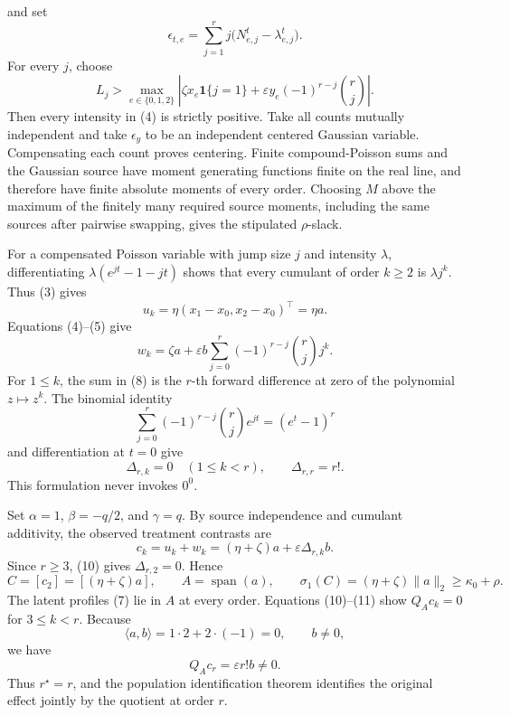 and set
\[
 \epsilon_{t,e}=\sum_{j=1}^r j\bigl(N^t_{e,j}-\lambda_{e,j}^t\bigr).      \tag{5}
\]
For every \(j\), choose
\[
 L_j>\max_{e\in\{0,1,2\}}
 \left|\zeta x_e\mathbf 1\{j=1\}
   +\varepsilon y_e(-1)^{r-j}\binom rj\right|.                           \tag{6}
\]
Then every intensity in (4) is strictly positive.  Take all counts mutually independent and take \(\epsilon_y\) to be an independent centered Gaussian variable.  Compensating each count proves centering.  Finite compound-Poisson sums and the Gaussian source have moment generating functions finite on the real line, and therefore have finite absolute moments of every order.  Choosing \(M\) above the maximum of the finitely many required source moments, including the same sources after pairwise swapping, gives the stipulated \(\rho\)-slack.

For a compensated Poisson variable with jump size \(j\) and intensity \(\lambda\), differentiating \(\lambda(e^{jt}-1-jt)\) shows that every cumulant of order \(k\geq2\) is \(\lambda j^k\).  Thus (3) gives
\[
 u_k=\eta(x_1-x_0,x_2-x_0)^\top=\eta a.                                  \tag{7}
\]
Equations (4)--(5) give
\[
 w_k=\zeta a+\varepsilon b
       \sum_{j=0}^r(-1)^{r-j}\binom rj j^k.                              \tag{8}
\]
For \(1\leq k\), the sum in (8) is the \(r\)-th forward difference at zero of the polynomial \(z\mapsto z^k\).  The binomial identity
\[
 \sum_{j=0}^r(-1)^{r-j}\binom rj e^{jt}=(e^t-1)^r                        \tag{9}
\]
and differentiation at \(t=0\) give
\[
 \Delta_{r,k}=0\quad(1\leq k<r),
 \qquad \Delta_{r,r}=r!.                                                  \tag{10}
\]
This formulation never invokes \(0^0\).

Set \(\alpha=1\), \(\beta=-q/2\), and \(\gamma=q\).  By source independence and cumulant additivity, the observed treatment contrasts are
\[
 c_k=u_k+w_k=(\eta+\zeta)a+\varepsilon\Delta_{r,k}b.                      \tag{11}
\]
Since \(r\geq3\), (10) gives \(\Delta_{r,2}=0\).  Hence
\[
 C=[c_2]=[(\eta+\zeta)a],
 \qquad A=\operatorname{span}(a),
 \qquad \sigma_1(C)=(\eta+\zeta)\|a\|_2\geq\kappa_0+\rho.             \tag{12}
\]
The latent profiles (7) lie in \(A\) at every order.  Equations (10)--(11) show \(Q_Ac_k=0\) for \(3\leq k<r\).  Because
\[
 \langle a,b\rangle=1\cdot2+2\cdot(-1)=0,
 \qquad b\neq0,                                                           \tag{13}
\]
we have
\[
 Q_Ac_r=\varepsilon r!b\neq0.                                             \tag{14}
\]
Thus \(r^\star=r\), and the population identification theorem identifies the original effect jointly by the quotient at order \(r\).

